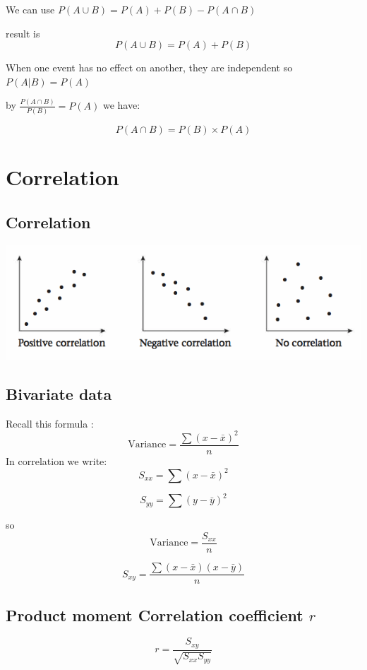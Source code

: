 \documentclass[a4paper]{article}
\begin{document}
We can use $P(A\cup B)=P(A)+P(B)-P(A\cap B)$

result is
\[
	P(A\cup B)=P(A)+P(B)
\]

\begin{defi}
	When one event has no effect on another, they are independent so $P(A|B)=P(A)$
\end{defi}

by $\frac{P(A\cap B)}{P(B)}=P(A)$ we have:

\[
	P(A\cap B)=P(B)\times P(A)
\]



\section{Correlation}
\subsection{Correlation}
\begin{center}
	\includegraphics[scale=0.5]{img_S/5_1_intro}
\end{center}
\subsection{Bivariate data}
Recall this formula :
\[
	\text{Variance}=\frac{\sum (x-\bar{x})^2}{n}
\]
In correlation we write:
\[
	S_{xx}=\sum (x-\bar{x})^2
\]

\[
	S_{yy}=\sum (y-\bar{y})^2
\]

so
\[
	\text{Variance}=\frac{S_{xx}}{n}
\]

\begin{defi}[Co-Variance]
	\[
		S_{xy}=\frac{\sum(x-\bar{x})(x-\bar{y})}{n}
	\]
\end{defi}

\subsection{Product moment Correlation coefficient $r$}
\[
	r=\frac{S_{xy}}{\sqrt{S_{xx}S_{yy}}}
\]
\end{document}
